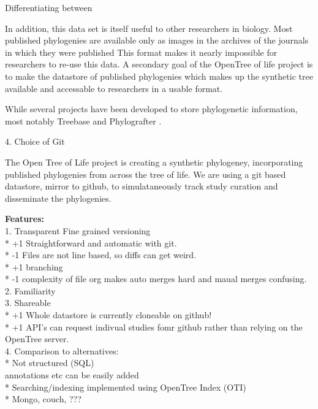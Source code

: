 \documentclass[a4paper,10pt]{article}
\begin{document}
Differentiating between 


In addition, this data set is itself useful to other researchers in biology.
Most published phylogenies are available only as images in the archives of the journals in which they were published \cite{drew?}
This format makes it nearly impossible for researchers to re-use this data.
A secondary goal of the OpenTree of life project is to make the datastore of published phylogenies which makes up the synthetic tree available and accessable to researchers in a usable format.
   
While several projects have been developed to store phylogenetic information, most notably Treebase \cite{treebas} and Phylografter \cite{phylografter}.


   4. Choice of Git


  
  
The Open Tree of Life project is creating a synthetic phylogeney, incorporating published phylogenies from across the tree of life.
We are using a git based datastore, mirror to github, to simulataneously track study curation and disseminate the phylogenies.

\textbf{Features:}\\

    1. Transparent Fine grained versioning\\
        * +1 Straightforward and automatic with git.\\
        * -1 Files are not line based, so diffs can get weird.\\
        * +1 branching\\
        * -1 complexity of file org makes auto merges hard and maual merges confusing.\\

    2. Familiarity\\
    
    3. Shareable\\
        * +1 Whole datastore is currently cloneable on github!\\
        * +1 API's can request indivual studies fomr github rather than relying on the OpenTree server.\\
        
  
    4. Comparison to alternatives:\\
        * Not structured (SQL)\\
          annotations etc can be easily added\\
        * Searching/indexing implemented using OpenTree Index (OTI)\\
        * Mongo, couch, ???\\
        
\end{document}
